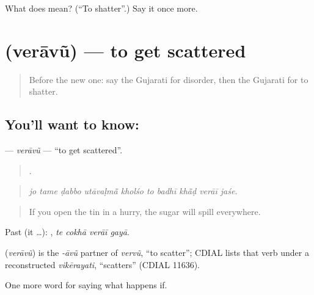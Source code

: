 \begin{tcolorbox}[breakable,colback=teal!4,colframe=teal!35!black,title={Before you move on}]
What does  mean? (\textquotedblleft{}To shatter\textquotedblright{}.) Say it once more.
\end{tcolorbox}
\section[\texorpdfstring{\gu{વેરાવું} (verāvũ)}{વેરાવું (verāvũ)}]{ (verāvũ) — to get scattered}

\label{lesson:GU-C391-veravu}



\begin{quote}
Before the new one: say the Gujarati for disorder, then the Gujarati for to shatter.
\end{quote}

\subsection*{You'll want to know: }
\textbf{} — \emph{verāvũ} — \textquotedblleft{}to get scattered\textquotedblright{}.

\begin{quote}
         .
\end{quote}

\begin{quote}
\emph{jo tame ḍabbo utāvaḷmā̃ kholśo to badhī khā̃ḍ verāī jaśe.}
\end{quote}

\begin{quote}
If you open the tin in a hurry, the sugar will spill everywhere.
\end{quote}

Past (it …):    , \emph{te cokhā verāī gayā}.

\begin{cousinweb}
\textbf{} (\emph{verāvũ}) is the \emph{-āvũ} partner of \emph{vervũ}, \textquotedblleft{}to scatter\textquotedblright{}; CDIAL lists that verb under a reconstructed \emph{vikērayati}, \textquotedblleft{}scatters\textquotedblright{} (CDIAL 11636).
\end{cousinweb}

\begin{grammarlens}[title={What you've built}]
One more word for saying what happens if.
\end{grammarlens}


